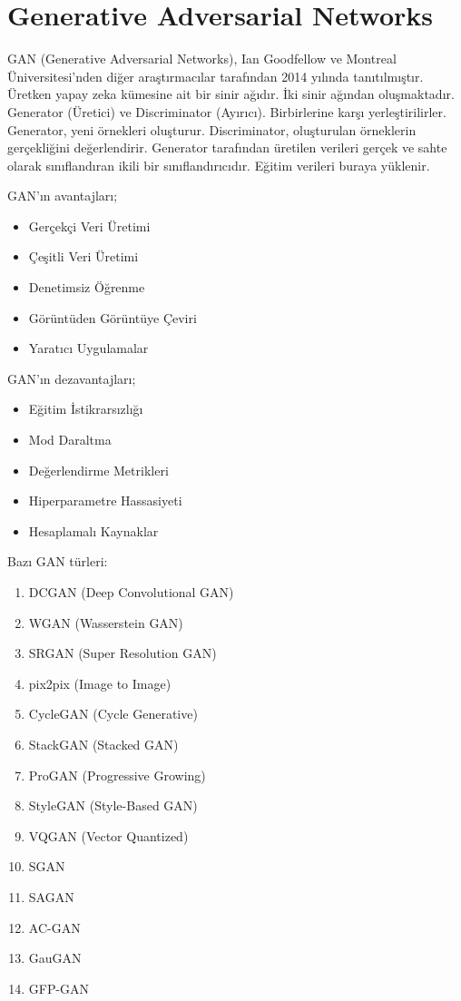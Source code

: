 \section{Generative Adversarial Networks}
GAN (Generative Adversarial Networks), Ian Goodfellow ve Montreal Üniversitesi'nden diğer araştırmacılar tarafından 2014 yılında tanıtılmıştır. Üretken yapay zeka kümesine ait bir sinir ağıdır. İki sinir ağından oluşmaktadır. Generator (Üretici) ve Discriminator (Ayırıcı). Birbirlerine karşı yerleştirilirler. Generator, yeni örnekleri oluşturur. Discriminator, oluşturulan örneklerin gerçekliğini değerlendirir. Generator tarafından üretilen verileri gerçek ve sahte olarak sınıflandıran ikili bir sınıflandırıcıdır. Eğitim verileri buraya yüklenir. 

GAN'ın avantajları;
\begin{itemize}
	\item Gerçekçi Veri Üretimi
	\item Çeşitli Veri Üretimi
	\item Denetimsiz Öğrenme
	\item Görüntüden Görüntüye Çeviri
	\item Yaratıcı Uygulamalar
\end{itemize}

GAN'ın dezavantajları;
\begin{itemize}
	\item Eğitim İstikrarsızlığı
	\item Mod Daraltma
	\item Değerlendirme Metrikleri
	\item Hiperparametre Hassasiyeti
	\item Hesaplamalı Kaynaklar
\end{itemize}

Bazı GAN türleri:

\begin{enumerate}
    \item DCGAN (Deep Convolutional GAN)
    \item WGAN (Wasserstein GAN)
    \item SRGAN (Super Resolution GAN)
    \item pix2pix (Image to Image)
    \item CycleGAN (Cycle Generative)
    \item StackGAN (Stacked GAN)
    \item ProGAN (Progressive Growing)
    \item StyleGAN (Style-Based GAN)
    \item VQGAN (Vector Quantized)
    \item SGAN
    \item SAGAN
    \item AC-GAN
    \item GauGAN
    \item GFP-GAN
\end{enumerate}

